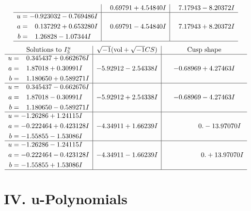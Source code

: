 \documentclass[1p]{elsarticle_modified}
\theoremstyle{definition}
\newcommand{\I}{\sqrt{-1}}
\begin{document}
$$\begin{array}{c|c|c}
 & \phantom{-}0.69791 + 4.54840 I & \phantom{-}7.17943 - 8.20372 I \\ \hline\begin{aligned}
u &= -0.923032 - 0.769486 I \\
a &= \phantom{-}0.137292 + 0.653280 I \\
b &= \phantom{-}1.26828 - 1.07344 I\end{aligned}
 & \phantom{-}0.69791 - 4.54840 I & \phantom{-}7.17943 + 8.20372 I\\
 \hline 
 \end{array}$$\newpage$$\begin{array}{c|c|c}  
\text{Solutions to }I^u_{3}& \I (\text{vol} + \sqrt{-1}CS) & \text{Cusp shape}\\
 \hline 
\begin{aligned}
u &= \phantom{-}0.345437 + 0.662676 I \\
a &= \phantom{-}1.87018 + 0.30991 I \\
b &= \phantom{-}1.180650 + 0.589271 I\end{aligned}
 & -5.92912 - 2.54338 I & -0.68969 + 4.27463 I \\ \hline\begin{aligned}
u &= \phantom{-}0.345437 - 0.662676 I \\
a &= \phantom{-}1.87018 - 0.30991 I \\
b &= \phantom{-}1.180650 - 0.589271 I\end{aligned}
 & -5.92912 + 2.54338 I & -0.68969 - 4.27463 I \\ \hline\begin{aligned}
u &= -1.26286 + 1.24115 I \\
a &= -0.222464 + 0.423128 I \\
b &= -1.55855 - 1.53086 I\end{aligned}
 & -4.34911 + 1.66239 I & \phantom{-0.000000 } 0. - 13.97070 I \\ \hline\begin{aligned}
u &= -1.26286 - 1.24115 I \\
a &= -0.222464 - 0.423128 I \\
b &= -1.55855 + 1.53086 I\end{aligned}
 & -4.34911 - 1.66239 I & \phantom{-0.000000 -}0. + 13.97070 I\\
 \hline 
 \end{array}$$\newpage
\newpage\renewcommand{\arraystretch}{1}
\centering \section*{ IV. u-Polynomials}
\end{document}
